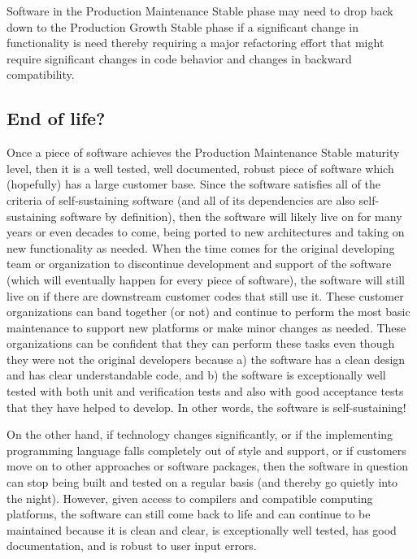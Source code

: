 \documentclass[11pt]{SANDreport}
\begin{document}
Software in the Production Maintenance Stable phase may need to drop
back down to the Production Growth Stable phase if a significant
change in functionality is need thereby requiring a major refactoring
effort that might require significant changes in code behavior and
changes in backward compatibility.


%
\subsection{End of life?}
%

Once a piece of software achieves the Production Maintenance Stable
maturity level, then it is a well tested, well documented, robust
piece of software which (hopefully) has a large customer base.  Since
the software satisfies all of the criteria of self-sustaining software
(and all of its dependencies are also self-sustaining software by
definition), then the software will likely live on for many years or
even decades to come, being ported to new architectures and taking on
new functionality as needed.  When the time comes for the original
developing team or organization to discontinue development and support
of the software (which will eventually happen for every piece of
software), the software will still live on if there are downstream
customer codes that still use it.  These customer organizations can
band together (or not) and continue to perform the most basic
maintenance to support new platforms or make minor changes as needed.
These organizations can be confident that they can perform these tasks
even though they were not the original developers because a) the
software has a clean design and has clear understandable code, and b)
the software is exceptionally well tested with both unit and
verification tests and also with good acceptance tests that they have
helped to develop.  In other words, the software is self-sustaining!

On the other hand, if technology changes significantly, or if the
implementing programming language falls completely out of style and
support, or if customers move on to other approaches or software
packages, then the software in question can stop being built and
tested on a regular basis (and thereby go quietly into the night).
However, given access to compilers and compatible computing
platforms, the software can still come back to life and can continue
to be maintained because it is clean and clear, is exceptionally well
tested, has good documentation, and is robust to user input errors.
\end{document}
